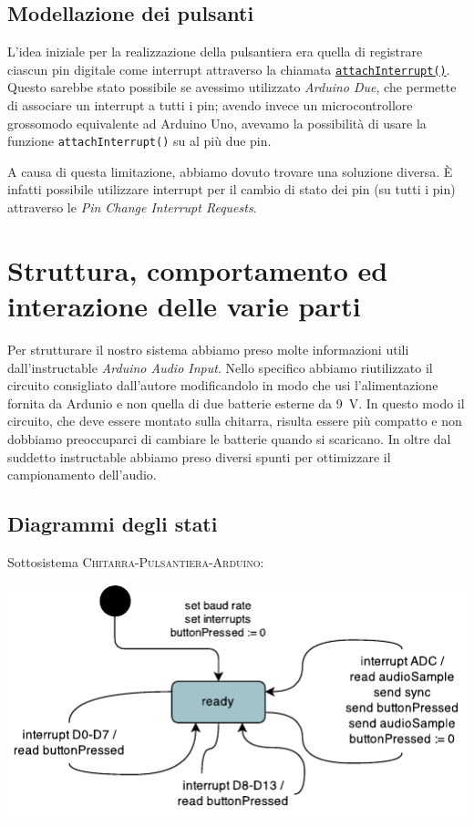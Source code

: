 \documentclass[a4paper,11pt]{article}
\begin{document}
\subsection{Modellazione dei pulsanti}
L'idea iniziale per la realizzazione della pulsantiera era quella di registrare ciascun pin digitale come interrupt attraverso la chiamata \href{http://www.arduino.cc/en/Reference/AttachInterrupt}{\texttt{attachInterrupt()}}. Questo sarebbe stato possibile se avessimo utilizzato \emph{Arduino Due}, che permette di associare un interrupt a tutti i pin; avendo invece un microcontrollore grossomodo equivalente ad Arduino Uno, avevamo la possibilità di usare la funzione \texttt{attachInterrupt()} su al più due pin.

A causa di questa limitazione, abbiamo dovuto trovare una soluzione diversa. È infatti possibile utilizzare interrupt per il cambio di stato dei pin (su tutti i pin) attraverso le \emph{Pin Change Interrupt Requests}\cite{allinterrupts}.

\section{Struttura, comportamento ed interazione delle varie parti}
Per strutturare il nostro sistema abbiamo preso molte informazioni utili dall'instructable \emph{Arduino Audio Input}\cite{arduinoinput}. Nello specifico abbiamo riutilizzato il circuito consigliato dall'autore modificandolo in modo che usi l'alimentazione fornita da Ardunio e non quella di due batterie esterne da \SI{9}{\volt}. In questo modo il circuito, che deve essere montato sulla chitarra, risulta essere più compatto e non dobbiamo preoccuparci di cambiare le batterie quando si scaricano. In oltre dal suddetto instructable abbiamo preso diversi spunti per ottimizzare il campionamento dell'audio.

\subsection{Diagrammi degli stati}
\noindent
Sottosistema \textsc{Chitarra-Pulsantiera-Arduino}:

\vspace{3mm}

\includegraphics[width=\textwidth]{stati1.pdf}
\end{document}
